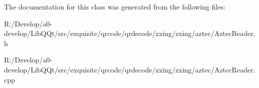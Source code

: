The documentation for this class was generated from the following files\+:\begin{DoxyCompactItemize}
\item 
R\+:/\+Develop/a0-\/develop/\+Lib\+Q\+Qt/src/exquisite/qrcode/qrdecode/zxing/zxing/aztec/Aztec\+Reader.\+h\item 
R\+:/\+Develop/a0-\/develop/\+Lib\+Q\+Qt/src/exquisite/qrcode/qrdecode/zxing/zxing/aztec/Aztec\+Reader.\+cpp\end{DoxyCompactItemize}
